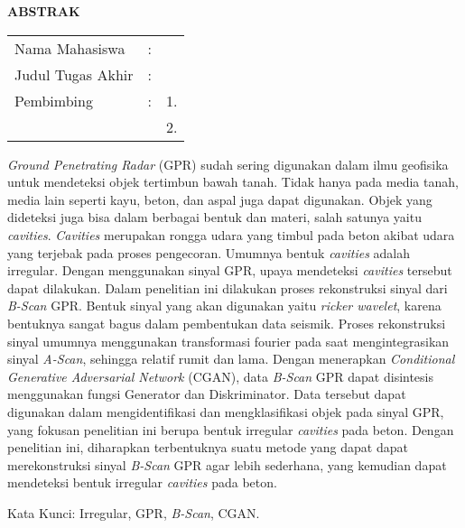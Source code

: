 \begin{center}
  \large\textbf{ABSTRAK}
\end{center}


\vspace{2ex}

\begingroup
\setlength{\tabcolsep}{0pt}

\noindent
\begin{tabularx}{\textwidth}{l >{\centering}m{2em} X}
  Nama Mahasiswa    & : & \name{}         \\

  Judul Tugas Akhir & : & \tatitle{}      \\

  Pembimbing        & : & 1. \advisor{}   \\
                    &   & 2. \coadvisor{} \\
\end{tabularx}
\endgroup

\emph{Ground Penetrating Radar} (GPR) sudah sering digunakan dalam ilmu geofisika untuk mendeteksi objek tertimbun bawah tanah. 
Tidak hanya pada media tanah, media lain seperti kayu, beton, dan aspal juga dapat digunakan. 
Objek yang dideteksi juga bisa dalam berbagai bentuk dan materi, salah satunya yaitu \emph{cavities}. 
\emph{Cavities} merupakan rongga udara yang timbul pada beton akibat udara yang terjebak pada proses pengecoran. 
Umumnya bentuk \emph{cavities} adalah irregular. 
Dengan menggunakan sinyal GPR, upaya mendeteksi \emph{cavities} tersebut dapat dilakukan. 
Dalam penelitian ini dilakukan proses rekonstruksi sinyal dari \emph{B-Scan} GPR. 
Bentuk sinyal yang akan digunakan yaitu \emph{ricker wavelet}, karena bentuknya sangat bagus dalam pembentukan data seismik. 
Proses rekonstruksi sinyal umumnya menggunakan transformasi fourier pada saat mengintegrasikan sinyal \emph{A-Scan}, sehingga relatif rumit dan lama. 
Dengan menerapkan \emph{Conditional Generative Adversarial Network} (CGAN), data \emph{B-Scan} GPR dapat disintesis menggunakan fungsi Generator dan Diskriminator. 
Data tersebut dapat digunakan dalam mengidentifikasi dan mengklasifikasi objek pada sinyal GPR, yang fokusan penelitian ini berupa bentuk irregular \emph{cavities} pada beton. 
Dengan penelitian ini, diharapkan terbentuknya suatu metode yang dapat dapat merekonstruksi sinyal \emph{B-Scan} GPR agar lebih sederhana, yang kemudian dapat mendeteksi bentuk irregular \emph{cavities} pada beton.

Kata Kunci: Irregular, GPR, \emph{B-Scan}, CGAN.
